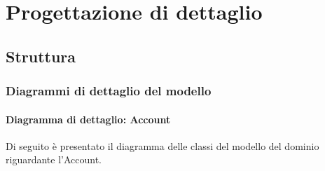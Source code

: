 \documentclass[12pt,a4paper]{report}
\begin{document}
\section{Progettazione di dettaglio}

\subsection{Struttura}

\subsubsection{Diagrammi di dettaglio del modello}

\paragraph{Diagramma di dettaglio: Account}

Di seguito è presentato il diagramma delle classi del modello del dominio riguardante l'Account.
\end{document}
